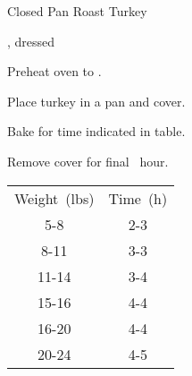 \begin{recipe}{Closed Pan Roast Turkey}{}{}

\begin{ingredients}
\item {}, dressed
\end{ingredients}

\begin{directions}
\item Preheat oven to .
\item Place turkey in a pan and cover.
\item Bake for time indicated in table.
\item Remove cover for final \half~hour.
\end{directions}

\begin{tabular}{|cc|}
\hline
Weight~(lbs) & Time~(h) \\
5-8 & 2\half{}-3 \\
8-11 & 3-3\half{} \\
11-14 & 3\half{}-4 \\
15-16 & 4-4\quarter{} \\
16-20 & 4\quarter{}-4\half{} \\
20-24 & 4\half{}-5 \\
\hline
\end{tabular}
\end{recipe}
